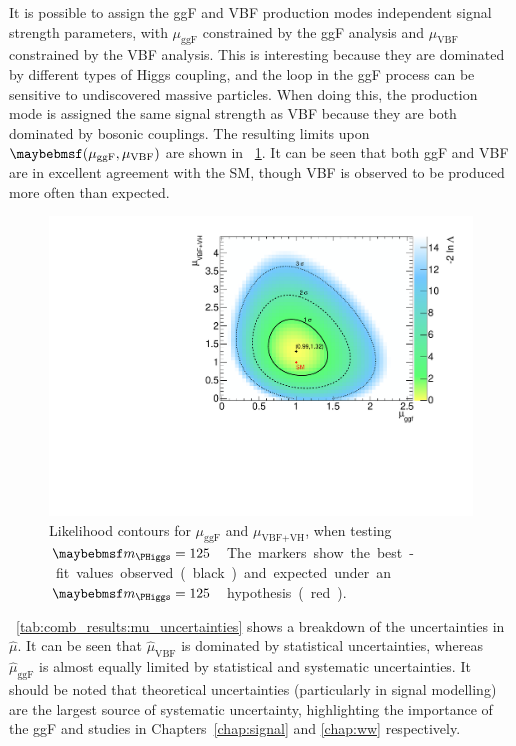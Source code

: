 It is possible to assign the ggF and VBF production modes independent signal strength 
parameters, with $\mu_{\text{ggF}}$ constrained by the ggF analysis and 
$\mu_{\text{VBF}}$ constrained by the VBF analysis. This is interesting because they 
are dominated by different types of Higgs coupling, and the loop in the ggF process can be 
sensitive to undiscovered massive particles. When doing this, the \VH production mode is 
assigned the same signal strength as VBF because they are both dominated by bosonic 
couplings. The resulting limits upon $\parenths{\mu_{\text{ggF}}, \mu_{\text{VBF}}}$ are 
shown in \Figure~\ref{fig:comb_results:muvbf_vs_muggf}. It can be seen that both ggF and VBF 
are in excellent agreement with the SM, though VBF is observed to be produced more often 
than expected.

\begin{figure}[t]
	\includegraphics[width=\mediumfigwidth]{custom_images/limits/muvbf_vs_muggf}
	\caption{Likelihood contours for $\mu_{\text{ggF}}$ and $\mu_{\text{VBF+VH}}$, when 
	testing \unit{$\mH = 125$}{\GeV}. The markers show the best-fit values observed 
	(black) and expected under an \unit{$\mH = 125$}{\GeV} hypothesis (red).}
	\label{fig:comb_results:muvbf_vs_muggf}
\end{figure}

\Table~\ref{tab:comb_results:mu_uncertainties} shows a breakdown of the uncertainties in 
$\hat{\mu}$. It can be seen that $\hat{\mu}_{\text{VBF}}$ is dominated by statistical 
uncertainties, whereas $\hat{\mu}_{\text{ggF}}$ is almost equally limited by statistical 
and systematic uncertainties. It should be noted that theoretical uncertainties 
(particularly in signal modelling) are the largest source of systematic uncertainty, 
highlighting the importance of the ggF and \WW studies in Chapters~\ref{chap:signal} and 
\ref{chap:ww} respectively.


